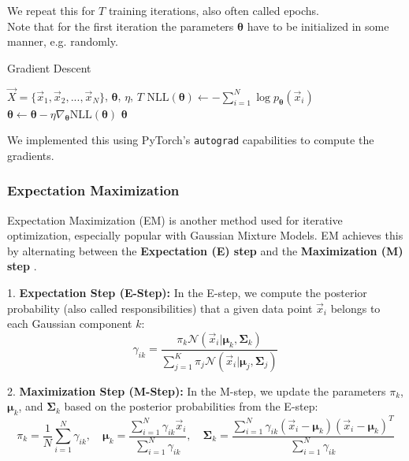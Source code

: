 We repeat this for $T$ training iterations, also often called epochs. \\
Note that for the first iteration the parameters $\boldsymbol{\theta}$ have to be initialized in some manner, e.g. randomly. 

\begin{algorithm}
    \caption{Gradient Descent}
    \label{alg:gd_gmm}
    \begin{algorithmic}[1]  
        \Require $\vec X = \{\vec x_1, \vec x_2, ..., \vec x_N\}$, $\boldsymbol{\theta}$, $\eta$, $T$
            \State $\text{NLL}(\boldsymbol{\theta}) \gets - \sum_{i=1}^{N} \log p_{\boldsymbol{\theta}}(\vec x_i)$
            \State $\boldsymbol{\theta} \gets \boldsymbol{\theta} - \eta \nabla_{\boldsymbol{\theta}} \text{NLL}(\boldsymbol{\theta})$
        \EndFor
        \State \Return $\boldsymbol{\theta}$
    \end{algorithmic}
\end{algorithm}

We implemented this using PyTorch's \cite{pytorch} \texttt{autograd} capabilities to compute the gradients.

\newpage
\subsubsection{Expectation Maximization}
\label{sec:gmm_em}

Expectation Maximization (EM) is another method used for iterative optimization, especially popular with Gaussian Mixture Models. EM achieves this by alternating between the \textbf{Expectation (E) step} and the \textbf{Maximization (M) step} \cite{ml_book}.

1. \textbf{Expectation Step (E-Step):} In the E-step, we compute the posterior probability (also called responsibilities) that a given data point $\vec{x}_i$ belongs to each Gaussian component $k$:
\[
   \gamma_{ik} = \frac{\pi_k \mathcal{N}(\vec{x}_i|\boldsymbol{\mu}_k, \boldsymbol{\Sigma}_k)}{\sum_{j=1}^{K} \pi_j \mathcal{N}(\vec{x}_i|\boldsymbol{\mu}_j, \boldsymbol{\Sigma}_j)}
\]

2. \textbf{Maximization Step (M-Step):} In the M-step, we update the parameters $\pi_k$, $\boldsymbol{\mu}_k$, and $\boldsymbol{\Sigma}_k$ based on the posterior probabilities from the E-step: 
\[
   \pi_k = \frac{1}{N} \sum_{i=1}^{N} \gamma_{ik}, \quad
   \boldsymbol{\mu}_k = \frac{\sum_{i=1}^{N} \gamma_{ik} \vec{x}_i}{\sum_{i=1}^{N} \gamma_{ik}}, \quad
   \boldsymbol{\Sigma}_k = \frac{\sum_{i=1}^{N} \gamma_{ik} (\vec{x}_i - \boldsymbol{\mu}_k)(\vec{x}_i - \boldsymbol{\mu}_k)^T}{\sum_{i=1}^{N} \gamma_{ik}}
\]

